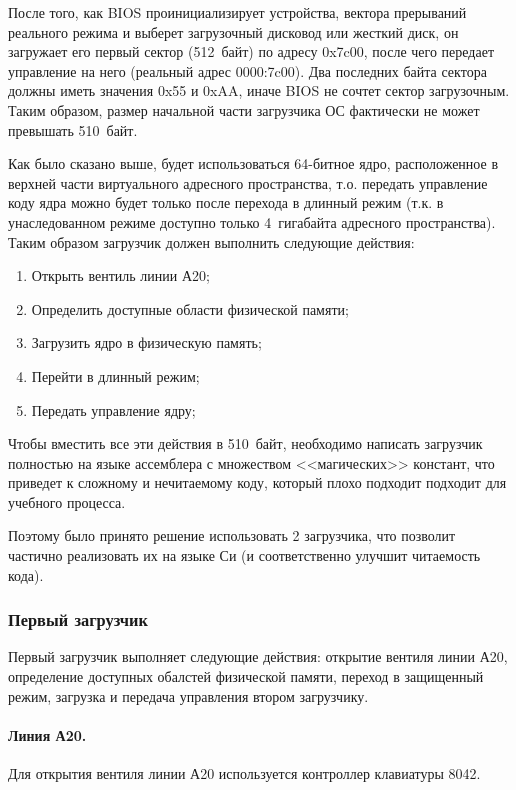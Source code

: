 После того, как BIOS проинициализирует устройства, вектора прерываний реального
режима и выберет загрузочный дисковод или жесткий диск, он загружает его
первый сектор (512~байт) по адресу 0x7c00, после чего передает управление на
него (реальный адрес 0000:7c00). Два последних байта сектора должны иметь
значения 0x55 и 0xAA, иначе BIOS не сочтет сектор загрузочным. Таким образом,
размер начальной части загрузчика ОС фактически не может превышать 510~байт.

Как было сказано выше, будет использоваться 64-битное ядро, расположенное в верхней части
виртуального адресного пространства, т.о. передать управление коду ядра можно будет
только после перехода в длинный режим (т.к. в унаследованном режиме доступно только 4~гигабайта
адресного пространства). Таким образом загрузчик должен выполнить следующие действия:
\begin{enumerate}[1.]
\item Открыть вентиль линии А20;
\item Определить доступные области физической памяти;
\item Загрузить ядро в физическую память;
\item Перейти в длинный режим;
\item Передать управление ядру;
\end{enumerate}

Чтобы вместить все эти действия в 510~байт, необходимо написать загрузчик полностью
на языке ассемблера с множеством <<магических>> констант, что приведет к сложному и
нечитаемому коду, который плохо подходит подходит для учебного процесса.

Поэтому было принято решение использовать 2 загрузчика, что позволит частично реализовать
их на языке Си (и соответственно улучшит читаемость кода).

\subsubsection*{Первый загрузчик}
Первый загрузчик выполняет следующие действия: открытие вентиля линии А20, определение доступных
обалстей физической памяти, переход в защищенный режим, загрузка и передача управления
втором загрузчику.

\paragraph{Линия А20.} Для открытия вентиля линии А20 используется контроллер клавиатуры 8042.

